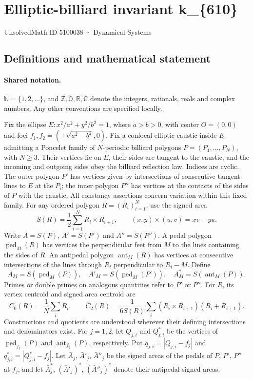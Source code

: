 \documentclass[11pt]{article}
\begin{document}
\setcounter{section}{5100037}
\section{Elliptic-billiard invariant k\_\{610\}}\label{5100038}
{\small\sffamily UnsolvedMath ID 5100038 · Dynamical Systems}
\subsection{Definitions and mathematical statement}

\paragraph{Shared notation.}$\mathbb N=\{1,2,\ldots\}$, and $\mathbb Z,\mathbb Q,\mathbb R,\mathbb C$ denote the integers, rationals, reals and complex numbers. Any other conventions are specified locally.


Fix the ellipse $E:x^2/a^2+y^2/b^2=1$, where $a>b>0$, with center $O=(0,0)$ and foci $f_1,f_2=(\pm\sqrt{a^2-b^2},0)$. Fix a confocal elliptic caustic inside $E$ admitting a Poncelet family of $N$-periodic billiard polygons $P=(P_1,\ldots,P_N)$, with $N\geq3$. Their vertices lie on $E$, their sides are tangent to the caustic, and the incoming and outgoing sides obey the billiard reflection law. Indices are cyclic. The outer polygon $P'$ has vertices given by intersections of consecutive tangent lines to $E$ at the $P_i$; the inner polygon $P''$ has vertices at the contacts of the sides of $P$ with the caustic. All constancy assertions concern variation within this fixed family.
For any ordered polygon $R=(R_i)_{i=1}^N$, use the signed area
\[S(R)=\frac12\sum_{i=1}^N R_i\times R_{i+1},\qquad (x,y)\times(u,v)=xv-yu.\]
Write $A=S(P)$, $A'=S(P')$ and $A''=S(P'')$. A pedal polygon $\operatorname{ped}_M(R)$ has vertices the perpendicular feet from $M$ to the lines containing the sides of $R$. An antipedal polygon $\operatorname{ant}_M(R)$ has vertices at consecutive intersections of the lines through $R_i$ perpendicular to $R_i-M$. Define
\[A_M=S(\operatorname{ped}_M(P)),\quad A'_M=S(\operatorname{ped}_M(P')),\quad A_M^*=S(\operatorname{ant}_M(P)).\]
Primes or double primes on analogous quantities refer to $P'$ or $P''$. For $R$, its vertex centroid and signed area centroid are
\[C_0(R)=\frac1N\sum_i R_i,\qquad C_2(R)=\frac{1}{6S(R)}\sum_i(R_i\times R_{i+1})(R_i+R_{i+1}).\]
Constructions and quotients are understood wherever their defining intersections and denominators exist.
For $j=1,2$, let $Q_{j,i}$ and $Q^*_{j,i}$ be the vertices of $\operatorname{ped}_{f_j}(P)$ and $\operatorname{ant}_{f_j}(P)$, respectively. Put $q_{j,i}=|Q_{j,i}-f_j|$ and $q^*_{j,i}=|Q^*_{j,i}-f_j|$. Let $\bar A_j$, $\bar A'_j$, $\bar A''_j$ be the signed areas of the pedals of $P$, $P'$, $P''$ at $f_j$, and let $\bar A_j^*$, $(\bar A'_j)^*$, $(\bar A''_j)^*$ denote their antipedal signed areas.
\end{document}

